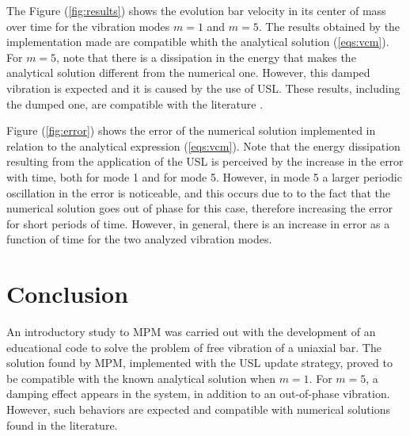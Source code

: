 \documentclass[preprint,12pt]{elsarticle}
\begin{document}
    The Figure (\ref{fig:results}) shows the evolution bar velocity in its center of mass over time for the vibration modes $m=1$ and $m=5$. The results obtained by the implementation made are compatible whith the analytical solution (\ref{eqs:vcm}). For $m=5$, note that there is a dissipation in the energy that makes the analytical solution different from the numerical one. However, this damped vibration is expected and it is caused by the use of USL. These results, including the dumped one, are compatible with the literature \cite{bardenhagen_energy_2002}.
    
    Figure (\ref{fig:error}) shows the error of the numerical solution implemented in relation to the analytical expression (\ref{eqs:vcm}). Note that the energy dissipation resulting from the application of the USL is perceived by the increase in the error with time, both for mode 1 and for mode 5. However, in mode 5 a larger periodic oscillation in the error is noticeable, and this occurs due to to the fact that the numerical solution goes out of phase for this case, therefore increasing the error for short periods of time. However, in general, there is an increase in error as a function of time for the two analyzed vibration modes.
	
	\section{Conclusion}
	An introductory study to MPM was carried out with the development of an educational code to solve the problem of free vibration of a uniaxial bar. The solution found by MPM, implemented with the USL update strategy, proved to be compatible with the known analytical solution when $m=1$. For $m=5$, a damping effect appears in the system, in addition to an out-of-phase vibration. However, such behaviors are expected and compatible with numerical solutions
    found in the literature.


	
	 
	
	
	
		

		
		
\end{document}
